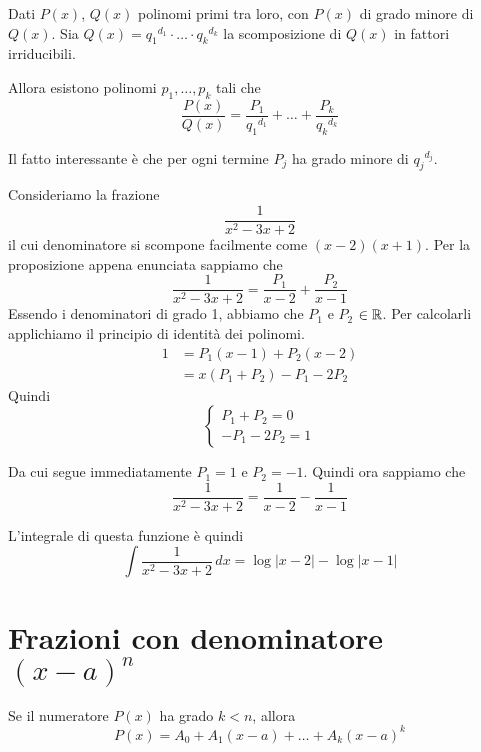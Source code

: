 \begin{proposition}
Dati $P(x)$, $Q(x)$ polinomi primi tra loro, con $P(x)$ di grado minore di $Q(x)$. Sia $Q(x) = {q_1}^{d_1} \cdot \ldots \cdot {q_k}^{d_k}$ la scomposizione di $Q(x)$ in fattori irriducibili.

Allora esistono polinomi $p_1, \ldots, p_k$ tali che 
\begin{equation*}
\frac{P(x)}{Q(x)} = \frac{P_1}{{q_1}^{d_1}} + \ldots + \frac{P_k}{{q_k}^{d_k}}
\end{equation*}
\end{proposition}

Il fatto interessante è che per ogni termine $P_j$ ha grado minore di ${q_j}^{d_j}$.

\begin{example}
Consideriamo la frazione
\begin{equation*}
\frac{1}{x^2-3x+2}
\end{equation*}
il cui denominatore si scompone facilmente come $(x-2)(x+1)$. Per la proposizione appena enunciata sappiamo che
\begin{equation*}
\frac{1}{x^2-3x+2} = \frac{P_1}{x-2} + \frac{P_2}{x-1}
\end{equation*}
Essendo i denominatori di grado 1, abbiamo che $P_1$ e $P_2$ $\in \mathbb R$. Per calcolarli applichiamo il principio di identità dei polinomi.
\begin{align*}
1 &= P_1(x-1) + P_2(x-2) \\
&= x(P_1+P_2) - P_1 -2P_2
\end{align*}
Quindi
\begin{equation*}
\begin{cases}
P_1 + P_2 = 0 \\
-P_1 -2P_2 = 1
\end{cases}
\end{equation*}

Da cui segue immediatamente $P_1 = 1$ e $P_2 = -1$. Quindi ora sappiamo che
\begin{equation*}
\frac{1}{x^2-3x+2} = \frac{1}{x-2} - \frac{1}{x-1}
\end{equation*}

L'integrale di questa funzione è quindi
\begin{equation*}
\int \frac{1}{x^2-3x+2} \, dx = \log |x-2| - \log |x-1|
\end{equation*}
\end{example}

\section{Frazioni con denominatore $(x-a)^n$}
Se il numeratore $P(x)$ ha grado $k < n$, allora
\begin{equation*}
P(x) = A_0 + A_1 (x-a) + \ldots + A_k (x-a)^k
\end{equation*}

